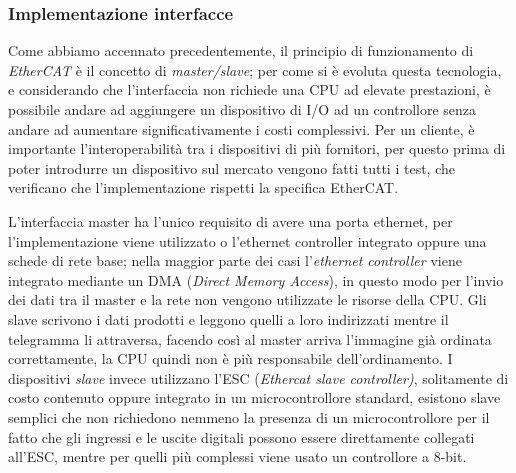 \subsubsection{Implementazione interfacce}
Come abbiamo accennato precedentemente, il principio di funzionamento di \textit{EtherCAT} è il concetto di \textit{master/slave}; per come si è evoluta questa tecnologia, e considerando che l'interfaccia non richiede una CPU ad elevate prestazioni, è possibile andare ad aggiungere un dispositivo di I/O ad un controllore senza andare ad aumentare significativamente i costi complessivi. Per un cliente, è importante l'interoperabilità tra i dispositivi di più fornitori, per questo prima di poter introdurre un dispositivo sul mercato vengono fatti tutti i test, che verificano che l'implementazione rispetti la specifica EtherCAT.
\par L'interfaccia master ha l'unico requisito di avere una porta ethernet, per l'implementazione viene utilizzato o l'ethernet controller integrato oppure una schede di rete base; nella maggior parte dei casi l'\textit{ethernet controller} viene integrato mediante un DMA (\textit{Direct Memory Access}), in questo modo per l'invio dei dati tra il master e la rete non vengono utilizzate le risorse della CPU. Gli slave scrivono i dati prodotti e leggono quelli a loro indirizzati mentre il telegramma li attraversa, facendo così al master arriva l'immagine già ordinata correttamente, la CPU quindi non è più responsabile dell'ordinamento. I dispositivi \textit{slave} invece utilizzano l'ESC (\textit{Ethercat slave controller)}, solitamente di costo contenuto oppure integrato in un microcontrollore standard, esistono slave semplici che non richiedono nemmeno la presenza di un microcontrollore per il fatto che gli ingressi e le uscite digitali possono essere direttamente collegati all'ESC, mentre per quelli più complessi viene usato un controllore a 8-bit.
